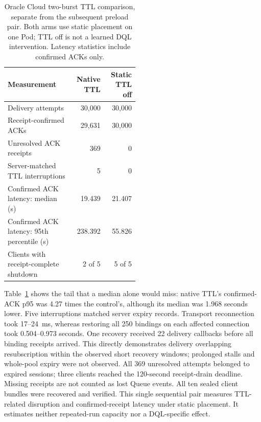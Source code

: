 \begin{table}[!htbp]
 \centering
 \small
 \renewcommand{\arraystretch}{1.14}
 \caption{Oracle Cloud two-burst TTL comparison, separate from the subsequent
 preload pair. Both arms use static placement on one Pod; TTL off is not a
 learned DQL intervention. Latency statistics include confirmed ACKs only.}
 \label{tab:ttl-loaded-results}
 \begin{tabular}{p{0.51\linewidth}rr}
  \toprule
  Measurement & Native TTL & Static TTL off \\
  \midrule
  Delivery attempts & 30,000 & 30,000 \\
  Receipt-confirmed ACKs & 29,631 & 30,000 \\
  Unresolved ACK receipts & 369 & 0 \\
  Server-matched TTL interruptions & 5 & 0 \\
  Confirmed ACK latency: median (s) & 19.439 & 21.407 \\
  Confirmed ACK latency: 95th percentile (s) & 238.392 & 55.826 \\
  Clients with receipt-complete shutdown & 2 of 5 & 5 of 5 \\
  \bottomrule
 \end{tabular}
\end{table}

Table~\ref{tab:ttl-loaded-results} shows the tail that a median alone would
miss: native TTL's confirmed-ACK p95 was 4.27 times the control's, although its
median was 1.968 seconds lower. Five interruptions matched server expiry records.
Transport reconnection took 17--24~ms, whereas restoring all 250 bindings on
each affected connection took 0.504--0.973 seconds. One recovery received
22 delivery callbacks before all binding receipts arrived. This directly
demonstrates delivery overlapping resubscription within the observed short
recovery windows; prolonged stalls and whole-pool expiry were not observed. All 369 unresolved
attempts belonged to expired sessions; three clients reached the 120-second
receipt-drain deadline. Missing receipts are not counted as lost Queue events.
All ten sealed client bundles were recovered and verified. This single
sequential pair measures TTL-related disruption and confirmed-receipt latency
under static placement. It estimates neither repeated-run capacity nor a
DQL-specific effect.

